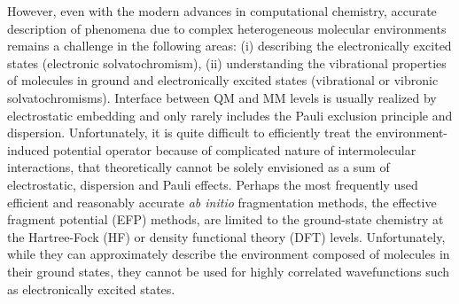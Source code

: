 \documentclass[aip,amsmath,amssymb,reprint,floatfix]{revtex4-1}
\begin{document}
However, even with the modern advances in computational chemistry, 
accurate description of phenomena due to complex heterogeneous molecular environments 
remains a challenge in the following areas: (i) describing the electronically excited states 
(electronic solvatochromism),\cite{Barbati.JACS.2014,
Szabla.Sponer.Jiri.Gora.JPCL.2015,
Bednarska.Zalesny.Tian.Murugan.Agren.Bartkowiak.Molecules.2017,
Jedrzejewska.Grabarz.Bartkowiak.Osmialowski.SpectChimActA.2018} 
(ii) understanding the vibrational properties of molecules in ground and electronically excited states
(vibrational or vibronic solvatochromisms).\cite{Blasiak.Londergan.Webb.Cho.ACR.2017} 
Interface between QM and MM levels is usually realized by electrostatic embedding
and only rarely includes the Pauli exclusion principle and dispersion.\cite{List.Olsen.Kongsted.PCCP.2016}
Unfortunately, it is quite difficult to efficiently treat the environment\hyp{}induced potential operator
because of complicated nature of intermolecular interactions, that theoretically
cannot be solely envisioned as a sum of electrostatic, dispersion and Pauli effects.
Perhaps the most frequently used efficient and reasonably accurate \emph{ab initio} fragmentation methods,
the effective fragment potential (EFP) methods, are limited to the ground\hyp{}state
chemistry at the Hartree\hyp{}Fock (HF)\cite{Gordon.Smith.Xu.Slipchenko.AnnuRevPhysChem.2013} 
or density functional theory (DFT) levels\cite{Nguyen.Pachter.Day.JCP.2014}.
Unfortunately, while they can approximately describe the environment composed of molecules in their ground states,
they cannot be used for highly correlated wavefunctions such as electronically excited states.
\end{document}
